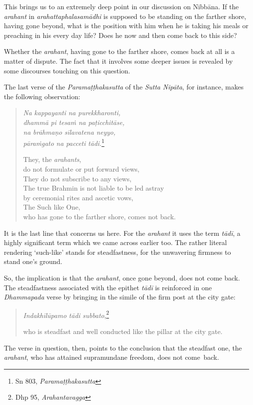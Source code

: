 This brings us to an extremely deep point in our discussion on Nibbāna. If the \emph{arahant} in \emph{arahattaphalasamādhi} is supposed to be standing on the farther shore, having gone beyond, what is the position with him when he is taking his meals or preaching in his every day life? Does he now and then come back to this side?

Whether the \emph{arahant}, having gone to the farther shore, comes back at all is a matter of dispute. The fact that it involves some deeper issues is revealed by some discourses touching on this question.

The last verse of the \emph{Paramaṭṭhakasutta} of the \emph{Sutta Nipāta}, for instance, makes the following observation:

\begin{quote}
\emph{Na kappayanti na purekkharonti,}\\
\emph{dhammā pi tesaṁ na paṭicchitāse,}\\
\emph{na brāhmaṇo sīlavatena neyyo,}\\
\emph{pāraṁgato na pacceti tādi.}\footnote{Sn 803, \emph{Paramaṭṭhakasutta}}

They, the \emph{arahants},\\
\vin do not formulate or put forward views,\\
They do not subscribe to any views,\\
The true Brahmin is not liable to be led astray\\
\vin by ceremonial rites and ascetic vows,\\
The Such like One,\\
\vin who has gone to the farther shore, comes not back.
\end{quote}

It is the last line that concerns us here. For the \emph{arahant} it uses the term \emph{tādī}, a highly significant term which we came across earlier too. The rather literal rendering `such-like' stands for steadfastness, for the unwavering firmness to stand one's ground.

So, the implication is that the \emph{arahant}, once gone beyond, does not come back. The steadfastness associated with the epithet \emph{tādī} is reinforced in one \emph{Dhammapada} verse by bringing in the simile of the firm post at the city gate:

\begin{quote}
\emph{Indakhīlūpamo tādi subbato},\footnote{Dhp 95, \emph{Arahantavagga}}

who is steadfast and well conducted like the pillar at the city gate.
\end{quote}

The verse in question, then, points to the conclusion that the steadfast one, the \emph{arahant}, who has attained supramundane freedom, does not come~back.
